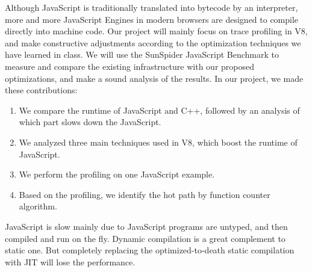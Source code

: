 \documentclass[conference]{IEEEtran}
\begin{document}
Although JavaScript is traditionally translated into bytecode by an interpreter, more and more JavaScript Engines in modern browsers are designed to compile directly into machine code. Our project will mainly focus on trace profiling\cite{Trace} in V8, and make constructive adjustments according to the optimization techniques we have learned in class. We will use the SunSpider JavaScript Benchmark to measure and compare the existing infrastructure with our proposed optimizations, and make a sound analysis of the results. 
In our project, we made these contributions:
\begin{enumerate}
\item We compare the runtime of JavaScript and C++, followed by an analysis of which part slows down the JavaScript.
\item We analyzed three main techniques used in V8, which boost the runtime of JavaScript.
\item We perform the profiling on one JavaScript example.
\item Based on the profiling, we identify the hot path by function counter algorithm.
\end{enumerate}
%
%

%
JavaScript is slow mainly due to JavaScript programs are untyped, and then compiled and run on the fly. Dynamic compilation is a great complement to static one. But completely replacing the optimized-to-death static compilation with JIT will lose the performance. 
%
%
\end{document}
